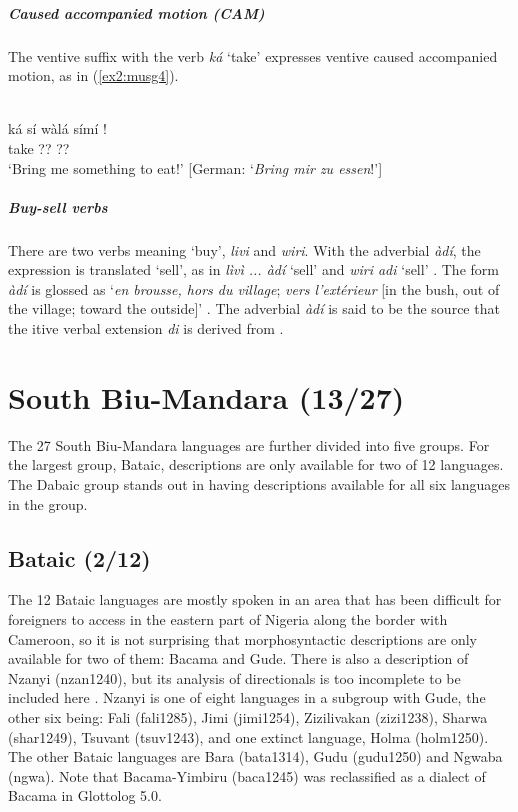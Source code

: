 \subparagraph{Caused accompanied motion (CAM)}

The ventive suffix with the verb \textit{ká} `take' expresses ventive caused accompanied motion, as in (\ref{ex2:musg4}). 

\ea\label{ex2:musg4}
 \\
\gll ká sí wàlá símí ! \\
take  ?? ??	\\
\glt `Bring me something to eat!' [German: `\textit{Bring mir zu essen}!']
\z 

\subparagraph{Buy-sell verbs}

There are two verbs meaning `buy', \textit{livi} and \textit{wiri}. With the adverbial \textit{àdí}, the expression is translated `sell', as in \textit{lìvì ... àdí} `sell' \citep[240]{tourneuxMulwiOuVulum1978} and \textit{wiri adi} `sell' \citep[124]{tourneuxLexiquePratiqueMunjuk1991}. The form \textit{àdí} is glossed as `\textit{en brousse, hors du village};\textit{ vers l'extérieur} [in the bush, out of the village; toward the outside]' \citep[71]{tourneuxLexiquePratiqueMunjuk1991}. The adverbial \textit{àdí} is said to be the source that the itive verbal extension \textit{di} is derived from \citep[133--134]{meyer-bahlburgStudienZurMorphologie1972}.

\section{South Biu-Mandara (13/27)}

The 27 South Biu-Mandara languages are further divided into five groups. For the largest group, Bataic, descriptions are only available for two of 12 languages. The Dabaic group stands out in having descriptions available for all six languages in the group. 

\subsection{Bataic (2/12)}

The 12 Bataic languages are mostly spoken in an area that has been difficult for foreigners to access in the eastern part of Nigeria along the border with Cameroon, so it is not surprising that morphosyntactic descriptions are only available for two of them: Bacama and Gude. There is also a description of Nzanyi (nzan1240), but its analysis of directionals is too incomplete to be included here \citep[44--46]{bensonNzanyiGrammarWriteup2014}. Nzanyi is one of eight languages in a subgroup with Gude, the other six being: Fali (fali1285), Jimi (jimi1254), Zizilivakan (zizi1238), Sharwa (shar1249), Tsuvant (tsuv1243), and one extinct language, Holma (holm1250). The other Bataic languages are
Bara (bata1314),
Gudu (gudu1250) and
Ngwaba (ngwa). Note that Bacama-Yimbiru (baca1245) was reclassified as a dialect of Bacama in Glottolog 5.0.

